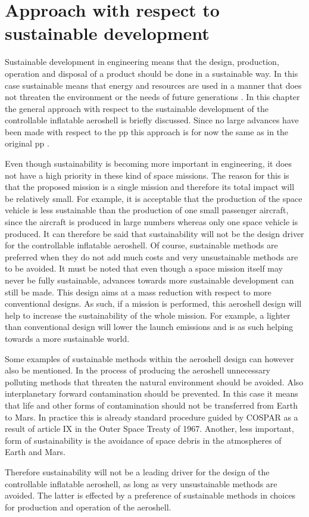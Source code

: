 \section{Approach with respect to sustainable development}\label{ch:sustain}


Sustainable development in engineering means that the design, production, operation and disposal of a product should be done in a sustainable way. In this case sustainable means that energy and resources are used in a manner that does not threaten the environment or the needs of future generations \cite{Masud2011}. In this chapter the general approach with respect to the sustainable development of the controllable inflatable aeroshell is briefly discussed. Since no large advances have been made with respect to the \acrfull{pp} this approach is for now the same as in the original \gls{pp} \cite{Balasooriyan2015}.

Even though sustainability is becoming more important in engineering, it does not have a high priority in these kind of space missions. The reason for this is that the proposed mission is a single mission and therefore its total impact will be relatively small. For example, it is acceptable that the production of the space vehicle is less sustainable than the production of one small passenger aircraft, since the aircraft is produced in large numbers whereas only one space vehicle is produced. It can therefore be said that sustainability will not be the design driver for the controllable inflatable aeroshell. Of course, sustainable methods are preferred when they do not add much costs and very unsustainable methods are to be avoided. It must be noted that even though a space mission itself may never be fully sustainable, advances towards more sustainable development can still be made. This design aims at a mass reduction with respect to more conventional designs. As such, if a mission is performed, this aeroshell design will help to increase the sustainability of the whole mission. For example, a lighter than conventional design will lower the launch emissions and is as such helping towards a more sustainable world.

Some examples of sustainable methods within the aeroshell design can however also be mentioned. In the process of producing the aeroshell unnecessary polluting methods that threaten the natural environment should be avoided. Also interplanetary forward contamination should be prevented. In this case it means that life and other forms of contamination should not be transferred from Earth to Mars. In practice this is already standard procedure guided by COSPAR as a result of article IX in the Outer Space Treaty of 1967. \cite{UnitedNations2008} Another, less important, form of sustainability is the avoidance of space debris in the atmospheres of Earth and Mars.

Therefore sustainability will not be a leading driver for the design of the controllable inflatable aeroshell, as long as very unsustainable methods are avoided. The latter is effected by a preference of sustainable methods in choices for production and operation of the aeroshell.
